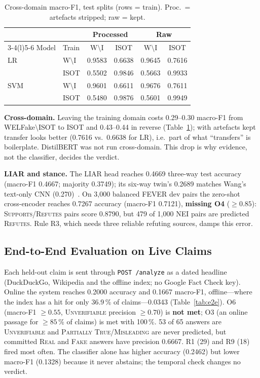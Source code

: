 \documentclass[conference]{IEEEtran}
\newcommand{\cls}[1]{\textsc{#1}}          %
\begin{document}
\begin{table}[t]
\caption{Cross-domain macro-F1, test splits (rows = train). Proc.\ = artefacts stripped; raw = kept.}
\label{tab:cross}
\centering\footnotesize
\setlength{\tabcolsep}{3.5pt}
\begin{tabular}{@{}l l c c c c@{}}
\toprule
 & & \multicolumn{2}{c}{Processed} & \multicolumn{2}{c}{Raw} \\
\cmidrule(lr){3-4}\cmidrule(l){5-6}
Model & Train & W$\setminus$I & ISOT & W$\setminus$I & ISOT \\
\midrule
LR  & W$\setminus$I & 0.9583 & 0.6638 & 0.9645 & 0.7616 \\
    & ISOT          & 0.5502 & 0.9846 & 0.5663 & 0.9933 \\
SVM & W$\setminus$I & 0.9601 & 0.6611 & 0.9676 & 0.7611 \\
    & ISOT          & 0.5480 & 0.9876 & 0.5601 & 0.9949 \\
\bottomrule
\end{tabular}
\end{table}

\textbf{Cross-domain.} Leaving the training domain costs 0.29--0.30 macro-F1 from WELFake$\setminus$ISOT to ISOT and 0.43--0.44 in reverse (Table~\ref{tab:cross}); with artefacts kept transfer looks better (0.7616 vs.\ 0.6638 for LR), i.e.\ part of what ``transfers'' is boilerplate. DistilBERT was not run cross-domain. This drop is why evidence, not the classifier, decides the verdict.

\textbf{LIAR and stance.} The LIAR head reaches 0.4669 three-way test accuracy (macro-F1 0.4667; majority 0.3749); its six-way twin's 0.2689 matches Wang's text-only CNN (0.270)~\cite{wang2017liar}. On 3{,}000 balanced FEVER dev pairs the zero-shot cross-encoder reaches 0.7267 accuracy (macro-F1 0.7121), \textbf{missing O4} ($\geq 0.85$): \textsc{Supports}/\textsc{Refutes} pairs score 0.8790, but 479 of 1{,}000 NEI pairs are predicted \textsc{Refutes}. Rule R3, which needs three reliable refuting sources, damps this error.

\subsection{End-to-End Evaluation on Live Claims}
Each held-out claim is sent through \texttt{POST /analyze} as a dated headline (DuckDuckGo, Wikipedia and the offline index; no Google Fact Check key). Online the system reaches 0.2000 accuracy and 0.1667 macro-F1, offline---where the index has a hit for only 36.9\,\% of claims---0.0343 (Table~\ref{tab:e2e}). O6 (macro-F1 $\geq 0.55$, \cls{Unverifiable} precision $\geq 0.70$) is \textbf{not met}; O3 (an online passage for $\geq 85$\,\% of claims) is met with 100\,\%. 53 of 65 answers are \cls{Unverifiable} and \cls{Partially True}/\cls{Misleading} are never predicted, but committed \cls{Real} and \cls{Fake} answers have precision 0.6667. R1 (29) and R9 (18) fired most often. The classifier alone has higher accuracy (0.2462) but lower macro-F1 (0.1328) because it never abstains; the temporal check changes no verdict.
\end{document}
